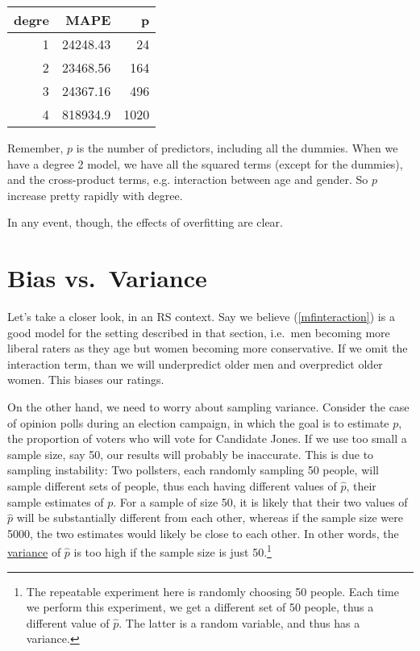 \bigskip

\begin{tabular}{|r|r|r|}
\hline
degre & MAPE & p \\
\hline
1 & 24248.43 & 24 \\
\hline
2 & 23468.56 & 164 \\
\hline
3 & 24367.16 & 496 \\  
\hline
4 & 818934.9 & 1020 \\
\hline
\end{tabular}

Remember, $p$ is the number of predictors, including all the dummies.
When we have a degree 2 model, we have all the squared terms (except for
the dummies), and the cross-product terms, e.g. interaction between age
and gender.  So $p$ increase pretty rapidly with degree.

In any event, though, the effects of overfitting are clear.

\section{Bias vs.\ Variance}

Let's take a closer look, in an RS context.  Say we believe
(\ref{mfinteraction}) is a good model for the setting described in that
section, i.e.\ men becoming more liberal raters as they age but women
becoming more conservative.  If we omit the interaction term, than we
will underpredict older men and overpredict older women.  This biases
our ratings.

On the other hand, we need to worry about sampling variance.  Consider
the case of opinion polls during an election campaign, in which the goal
is to estimate $p$, the proportion of voters who will vote for Candidate
Jones.  If we use too small a sample size, say 50, our results will
probably be inaccurate.  This is due to sampling instability:  Two
pollsters, each randomly sampling 50 people, will sample different sets
of people, thus each having different values of $\widehat{p}$, their
sample estimates of $p$.  For a sample of size 50, it is likely that
their two values of $\widehat{p}$ will be substantially different from
each other, whereas if the sample size were 5000, the two estimates
would likely be close to each other.  In other words, the
\underline{variance} of $\widehat{p}$ is too high if the sample size is
just 50.\footnote{The repeatable experiment here is randomly choosing 50
people.  Each time we perform this experiment, we get a different set of
50 people, thus a different value of $\widehat{p}$.  The latter is a
random variable, and thus has a variance.}

